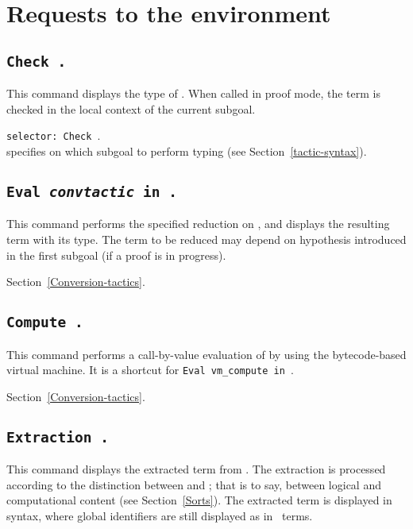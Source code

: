 \section{Requests to the environment}

\subsection[\tt Check {\term}.]{\tt Check {\term}.\label{Check}
}
This command displays the type of {\term}. When called in proof mode,
the term is checked in the local context of the current subgoal.

\begin{Variants}
\item {\tt selector: Check {\term}}.\\
specifies on which subgoal to perform typing (see
  Section~\ref{tactic-syntax}).
\end{Variants}


\subsection[\tt Eval {\rm\sl convtactic} in {\term}.]{\tt Eval {\rm\sl convtactic} in {\term}.}

This command performs the specified reduction on {\term}, and displays
the resulting term with its type. The term to be reduced may depend on
hypothesis introduced in the first subgoal (if a proof is in
progress).

\SeeAlso Section~\ref{Conversion-tactics}.

\subsection[\tt Compute {\term}.]{\tt Compute {\term}.}

This command performs a call-by-value evaluation of {\term} by using
the bytecode-based virtual machine. It is a shortcut for
{\tt Eval vm\_compute in {\term}}.

\SeeAlso Section~\ref{Conversion-tactics}.

\subsection[\tt Extraction \term.]{\tt Extraction \term.\label{ExtractionTerm}
}
This command displays the extracted term from
{\term}. The extraction is processed according to the distinction
between {\Set} and {\Prop}; that is to say, between logical and
computational content (see Section~\ref{Sorts}). The extracted term is
displayed in {\ocaml} syntax, where global identifiers are still
displayed as in \Coq\ terms.

